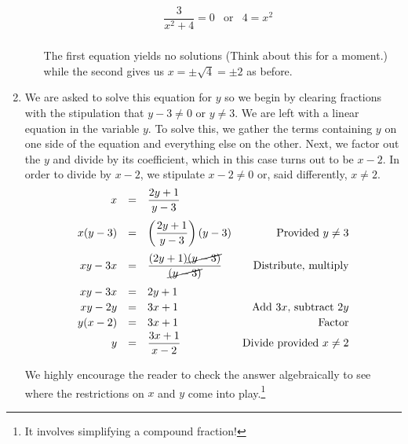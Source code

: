 \begin{ex}
\begin{enumerate}
\begin{itemize}
\[\begin{array}{rclr}
\dfrac{3}{x^2+4} = 0 & \text{or} & 4 = x^2 & \\ \end{array} \]

The first equation yields no solutions (Think about this for a moment.) while the second gives us $x = \pm \sqrt{4} = \pm 2$ as before.


\end{itemize}

\item  We are asked to solve this equation for $y$ so we begin by clearing fractions with the stipulation that $y-3 \neq 0$ or $y \neq 3$.   We are left with a linear equation in the variable $y$.  To solve this, we gather the terms containing $y$ on one side of the equation and everything else on the other.  Next, we factor out the $y$ and divide by its coefficient, which in this case turns out to be $x-2$.  In order to divide by $x-2$, we stipulate $x - 2 \neq 0$ or, said differently, $x \neq 2$. \[ \begin{array}{rclr}

 x & = & \dfrac{2y+1}{y-3} & \\ [12pt]

x(y-3) & = & \left(\dfrac{2y+1}{y-3}\right)(y-3) & \text{Provided $y \neq 3$} \\ [12pt]

xy - 3x & = & \dfrac{(2y+1)\cancel{(y-3)}}{\cancel{(y-3)}} & \text{Distribute, multiply} \\ [12pt]

xy - 3x & = & 2y + 1 & \\ [2pt]

xy - 2y & = & 3x+1 & \text{Add $3x$, subtract $2y$} \\ [2pt]

y(x-2) & = & 3x+1 & \text{Factor} \\ [2pt]

y & = & \dfrac{3x+1}{x-2} & \text{Divide provided $x \neq 2$} \\

\end{array}\]

We highly encourage the reader to check the answer algebraically to see where the restrictions on $x$ and $y$ come into play.\footnote{It involves simplifying a compound fraction!}


\end{enumerate}
\end{ex}
